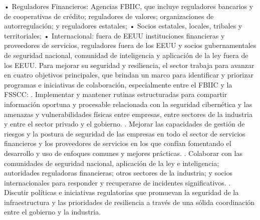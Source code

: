 \documentclass{article}
\begin{document}
\newline
\newline
• Reguladores Financieros: Agencias FBIIC, que incluye reguladores bancarios y de cooperativas de crédito; reguladores de valores; organizaciones de autorregulación; y reguladores estatales;
\newline
\newline
• Socios estatales, locales, tribales y territoriales; 
\newline
\newline
• Internacional: fuera de EEUU instituciones financieras y proveedores de servicios, reguladores fuera de los EEUU y socios gubernamentales de seguridad nacional, comunidad de inteligencia y aplicación de la ley fuera de los EEUU.
 \newline
\newline
Para mejorar su seguridad y resiliencia, el sector trabaja para avanzar en cuatro objetivos principales, que brindan un marco para identificar y priorizar programas e iniciativas de colaboración, especialmente entre el FBIIC y la FSSCC:
 \newline
{}. Implementar y mantener rutinas estructuradas para compartir información oportuna y procesable relacionada con la seguridad cibernética y las amenazas y vulnerabilidades físicas entre empresas, entre sectores de la industria y entre el sector privado y el gobierno.
\newline
{}. Mejorar las capacidades de gestión de riesgos y la postura de seguridad de las empresas en todo el sector de servicios financieros y los proveedores de servicios en los que confían fomentando el desarrollo y uso de enfoques comunes y mejores prácticas.
\newline
{}. Colaborar con las comunidades de seguridad nacional, aplicación de la ley e inteligencia; autoridades reguladoras financieras; otros sectores de la industria; y socios internacionales para responder y recuperarse de incidentes significativos.
\newline
{}. Discutir políticas e iniciativas regulatorias que promuevan la seguridad de la infraestructura y las prioridades de resiliencia a través de una sólida coordinación entre el gobierno y la industria.
\newline
\end{document}
